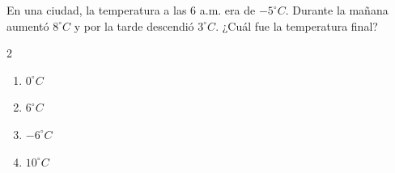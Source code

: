 En una ciudad, la temperatura a las 6 a.m. era de \(-5^\circ C\). Durante la mañana aumentó \(8^\circ C\) y por la tarde descendió \(3^\circ C\). ¿Cuál fue la temperatura final?
\begin{multicols}{2}
\begin{enumerate}[label=\alph*)]
\item \(0^\circ C\)
\item \(6^\circ C\)
\item \(-6^\circ C\)
\item \(10^\circ C\)
\end{enumerate}
\end{multicols}